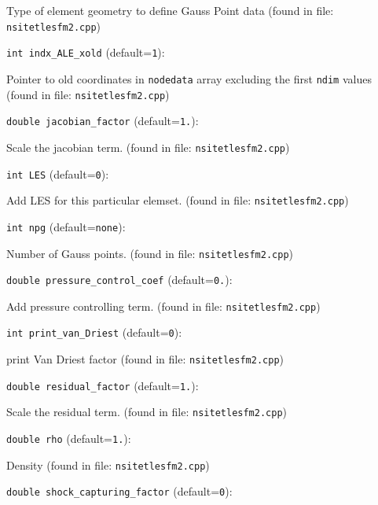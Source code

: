 Type of element geometry to define Gauss Point data
 (found in file: \verb+nsitetlesfm2.cpp+)
\item\verb+int indx_ALE_xold+ {\rm(default=\verb|1|)}:

Pointer to old coordinates in
 \verb+nodedata+ array excluding the first \verb+ndim+ values
 (found in file: \verb+nsitetlesfm2.cpp+)
\item\verb+double jacobian_factor+ {\rm(default=\verb|1.|)}:

Scale the jacobian term. 
 (found in file: \verb+nsitetlesfm2.cpp+)
\item\verb+int LES+ {\rm(default=\verb|0|)}:

Add LES for this particular elemset.
 (found in file: \verb+nsitetlesfm2.cpp+)
\item\verb+int npg+ {\rm(default=\verb|none|)}:

Number of Gauss points.
 (found in file: \verb+nsitetlesfm2.cpp+)
\item\verb+double pressure_control_coef+ {\rm(default=\verb|0.|)}:

Add pressure controlling term. 
 (found in file: \verb+nsitetlesfm2.cpp+)
\item\verb+int print_van_Driest+ {\rm(default=\verb|0|)}:

print Van Driest factor
 (found in file: \verb+nsitetlesfm2.cpp+)
\item\verb+double residual_factor+ {\rm(default=\verb|1.|)}:

Scale the residual term. 
 (found in file: \verb+nsitetlesfm2.cpp+)
\item\verb+double rho+ {\rm(default=\verb|1.|)}:

Density
 (found in file: \verb+nsitetlesfm2.cpp+)
\item\verb+double shock_capturing_factor+ {\rm(default=\verb|0|)}:

